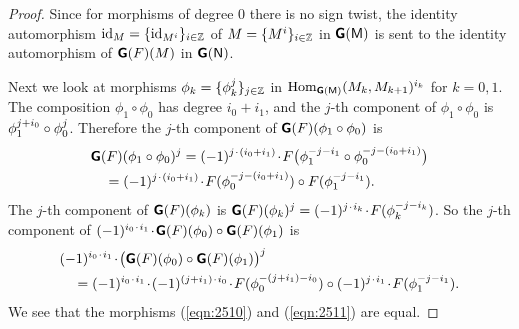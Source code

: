 \begin{proof}
Since for morphisms of degree $0$ there is no sign twist, the identity 
automorphism 
$\operatorname{id}_M = \{ \operatorname{id}_{M^i} \}_{i \in \mathbb{Z}}$
of $M = \{ M^i \}_{i \in \mathbb{Z}}$ in $\boldsymbol{\mathsf{G}}(\operatorname{\mathsf{M}})$
is sent to the identity automorphism of $\boldsymbol{\mathsf{G}}(F)(M)$ in 
$\boldsymbol{\mathsf{G}}(\operatorname{\mathsf{N}})$. 

Next we look at morphisms 
$\phi_k = \{ \phi_k^{ j} \}_{j \in \mathbb{Z}}$
in 
$\operatorname{Hom}_{\boldsymbol{\mathsf{G}}(\operatorname{\mathsf{M}})}(M_k, M_{k + 1})^{i_k}$ 
for $k = 0, 1$. 
The composition $\phi_1 \circ \phi_0$ has degree $i_0 + i_1$, and the $j$-th 
component of $\phi_1 \circ \phi_0$ is 
$\phi_1^{ j + i_0} \circ \phi_0^{ j}$.
Therefore the $j$-th component of $\boldsymbol{\mathsf{G}}(F)(\phi_1 \circ \phi_0)$ 
is 
\begin{equation} \label{eqn:2510}
\begin{aligned}
& \boldsymbol{\mathsf{G}}(F)(\phi_1 \circ \phi_0)^{ j} 
= (-1)^{ j \mspace{1.5mu}{\cdot}\mspace{1.5mu} (i_0 + i_1)} \mspace{1.5mu}{\cdot}\mspace{1.5mu} 
F \bigl( \phi_1^{-j - i_1} \circ \phi_0^{-j - (i_0 + i_1)} \bigr)
\\
& \quad = (-1)^{ j \mspace{1.5mu}{\cdot}\mspace{1.5mu} (i_0 + i_1)} \mspace{1.5mu}{\cdot}\mspace{1.5mu} 
F(\phi_0^{-j - (i_0 + i_1)}) \circ F(\phi_1^{-j - i_1}) .
\end{aligned}
\end{equation}
The  $j$-th component of $\boldsymbol{\mathsf{G}}(F)(\phi_k)$ is 
$\boldsymbol{\mathsf{G}}(F)(\phi_k)^{ j} = 
(-1)^{ j \mspace{1.5mu}{\cdot}\mspace{1.5mu} i_k} \mspace{1.5mu}{\cdot}\mspace{1.5mu} F(\phi_k^{-j - i_k})$. 
So the $j$-th component of 
$(-1)^{i_0 \mspace{1.5mu}{\cdot}\mspace{1.5mu} i_1} \mspace{1.5mu}{\cdot}\mspace{1.5mu} \boldsymbol{\mathsf{G}}(F)(\phi_0) \circ \boldsymbol{\mathsf{G}}(F)(\phi_1)$ 
is 
\begin{equation} \label{eqn:2511}
\begin{aligned}
& (-1)^{i_0 \mspace{1.5mu}{\cdot}\mspace{1.5mu} i_1} \mspace{1.5mu}{\cdot}\mspace{1.5mu} 
\bigl( \boldsymbol{\mathsf{G}}(F)(\phi_0) \circ \boldsymbol{\mathsf{G}}(F)(\phi_1) \bigr)^j 
\\
& \quad = (-1)^{i_0 \mspace{1.5mu}{\cdot}\mspace{1.5mu} i_1} \mspace{1.5mu}{\cdot}\mspace{1.5mu} 
(-1)^{(j + i_1) \mspace{1.5mu}{\cdot}\mspace{1.5mu} i_0} \mspace{1.5mu}{\cdot}\mspace{1.5mu} F(\phi_0^{-(j + i_1) - i_0})
\circ (-1)^{ j \mspace{1.5mu}{\cdot}\mspace{1.5mu} i_1} \mspace{1.5mu}{\cdot}\mspace{1.5mu} F(\phi_1^{-j - i_1}) . 
\end{aligned}
\end{equation}
We see that the morphisms (\ref{eqn:2510}) and (\ref{eqn:2511}) are equal. 
\end{proof}

